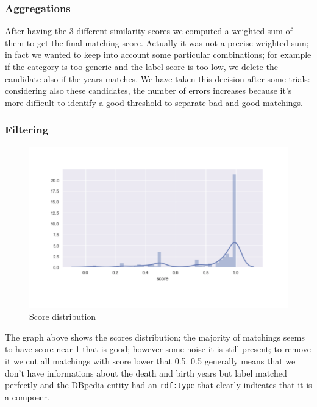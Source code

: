 \documentclass[paper=a4, fontsize=11pt]{scrartcl}
\begin{document}
\begin{enumerate}
\end{enumerate}

\subsubsection{Aggregations}

After having the 3 different similarity scores we computed a weighted sum of them  to get the final matching score. Actually it was not a precise weighted sum; in fact we wanted to keep into account some particular combinations; for example if the category is too generic and the label score is too low, we delete the candidate also if the years matches. We have taken this decision after some trials: considering also these candidates, the number of errors increases because it's more difficult to identify a good threshold to separate bad and good matchings.

\subsubsection{Filtering}

\begin{figure}[!htb]
  \centering 
    \includegraphics[width=1\textwidth]{images/score_distribution.jpg}
    \caption{Score distribution}
\end{figure}

The graph above shows the scores distribution; the majority of matchings seems to have score near 1 that is good; however some noise it is still present; to remove it we cut all matchings with score lower that 0.5. 0.5 generally means that we don't have informations about the death and birth years but label matched perfectly and the DBpedia entity had an \verb|rdf:type| that clearly indicates that it is a composer.
\end{document}
